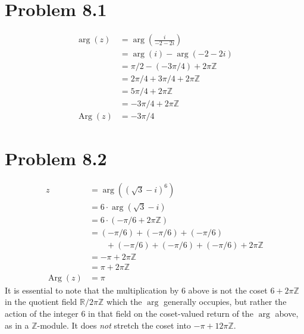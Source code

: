 \documentclass{article}
\theoremstyle{definition}
\newcommand{\R}{\mathbb{R}}
\newcommand{\Z}{\mathbb{Z}}
\newcommand{\p}[1]{\left(#1\right)}
\begin{document}
\section{Problem 8.1}
\begin{align*}
\arg(z)
&= \arg\p{\frac{i}{-2-2i}} \\
&= \arg(i) - \arg(-2-2i) \\
&= \pi/2 - (-3\pi/4) + 2\pi\Z \\
&= 2\pi/4 + 3\pi/4 + 2\pi\Z \\
&= 5\pi/4 + 2\pi\Z \\
&= -3\pi/4 + 2\pi\Z \\
\operatorname{Arg}(z) &= -3\pi/4
\end{align*}

\section{Problem 8.2}
\begin{align*}
z
&= \arg\p{ \p{\sqrt{3}-i}^6 } \\
&= 6 \cdot \arg\p{\sqrt{3}-i} \\
&= 6 \cdot (-\pi/6 + 2\pi\Z)  \\
&= (-\pi/6)+(-\pi/6)+(-\pi/6) \\
&\qquad+(-\pi/6)+(-\pi/6)+(-\pi/6)+2\pi\Z \\
&= -\pi + 2\pi\Z \\
&= \pi + 2\pi\Z \\
\operatorname{Arg}(z) &= \pi 
\end{align*}
It is essential to note that the multiplication by 6 above is not the coset $6+2\pi\Z$ in the 
quotient field $\R/2\pi\Z$ which the $\arg$ generally occupies, but rather the action of 
the integer $6$ 
in that field on the coset-valued return of the $\arg$ above, as in a $\Z$-module. It does 
\textit{not} stretch the coset into $-\pi+12\pi\Z$.
\end{document}
